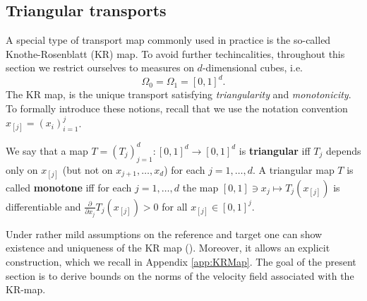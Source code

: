 \subsection{Triangular transports}\label{sec:trireg}
A special type of transport map commonly used in practice is the
  so-called Knothe-Rosenblatt (KR) map. To avoid further
  techincalities, throughout this section we restrict ourselves to
  measures on $d$-dimensional cubes, i.e.
  \begin{equation}\label{eq:cube}
    \Omega_0=\Omega_1=[0,1]^d.
  \end{equation}
  The KR map, is the unique transport satisfying \emph{triangularity}
  and \emph{monotonicity}. To formally introduce these notions, recall
  that we use the notation convention $x_{[j]}=(x_i)_{i=1}^j$.
  \begin{definition}
    We say that a map $T=(T_j)_{j=1}^d:[0,1]^d\to [0,1]^d$ is {\bf
      triangular} iff $T_j$ depends only on $x_{[j]}$ (but not on
    $x_{j+1},\dots,x_d$) for each $j=1,\dots,d$. A triangular map $T$
    is called {\bf monotone} iff for each $j=1,\dots,d$ the map
    $[0,1]\ni x_j\mapsto T_j(x_{[j]})$ is differentiable and
    $\frac{\partial}{\partial x_j} T_j(x_{[j]})>0$ for all
    $x_{[j]}\in [0,1]^j$.
  \end{definition}
  Under rather mild assumptions on the reference and target one can
  show existence and uniqueness of the KR map (\cite{OTAppliedMathematician}).
  Moreover, it allows an explicit construction, which we recall in
  Appendix \ref{app:KRMap}. The goal of the present section is to
  derive bounds on the norms of the velocity field associated with the
  KR-map.



